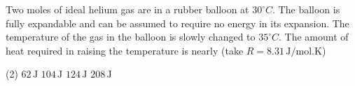 
\item Two moles of ideal helium gas are in a rubber balloon at \(30^\circ C\). The balloon is fully expandable and can be assumed to require no energy in its expansion. The temperature of the gas in the balloon is slowly changed to \(35^\circ C\). The amount of heat required in raising the temperature is nearly (take \(R = 8.31 \, \text{J/mol.K}\))
    \begin{tasks}(2)
        \task \(62 \, \text{J}\)
        \task \(104 \, \text{J}\)
        \task \(124 \, \text{J}\)
        \task \(208 \, \text{J}\)
    \end{tasks}
